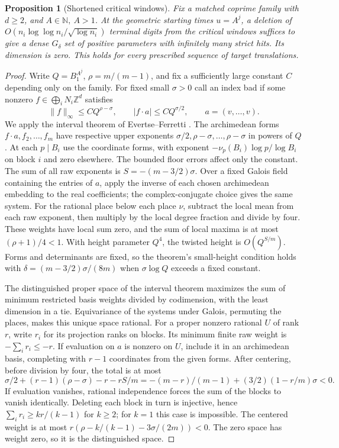 \documentclass[11pt,reqno,a4paper]{amsart}
\newtheorem{proposition}[theorem]{Proposition}
\theoremstyle{remark}
\numberwithin{equation}{section}
\begin{document}
\begin{proposition}[Shortened critical windows]\label{prop:short}
Fix a matched coprime family with \(d\ge2\), and \(A\in\mathbb N,\ A>1\). At the geometric starting times \(u=A^j\), a deletion of \(O(n_i\log\log n_i/\sqrt{\log n_i})\) terminal digits from the critical windows suffices to give a dense \(G_\delta\) set of positive parameters with infinitely many strict hits. Its dimension is zero. This holds for every prescribed sequence of target translations.
\end{proposition}
\begin{proof}
Write \(Q=B_1^{A^j}\), \(\rho=m/(m-1)\), and fix a sufficiently large constant \(C\) depending only on the family. For fixed small \(\sigma>0\) call an index bad if some nonzero \(f\in\bigoplus_i N_i\mathbb Z^d\) satisfies
\[
 \|f\|_\infty\le C Q^{\rho-\sigma},
 \qquad |f\cdot a|\le C Q^{\sigma/2},\qquad a=(v,\ldots,v).
\]
We apply the interval theorem of Evertse--Ferretti \cite[Theorem~2.3]{EF}. The archimedean forms \(f\cdot a,f_2,\ldots,f_m\) have respective upper exponents \(\sigma/2,\rho-\sigma,\ldots,\rho-\sigma\) in powers of \(Q\). At each \(p\mid B_i\) use the coordinate forms, with exponent \(-\nu_p(B_i)\log p/\log B_i\) on block \(i\) and zero elsewhere. The bounded floor errors affect only the constant. The sum of all raw exponents is \(S=-(m-3/2)\sigma\).
Over a fixed Galois field containing the entries of \(a\), apply the inverse of each chosen archimedean embedding to the real coefficients; the complex-conjugate choice gives the same system. For the rational place below each place \(\nu\), subtract the local mean from each raw exponent, then multiply by the local degree fraction and divide by four. These weights have local sum zero, and the sum of local maxima is at most \((\rho+1)/4<1\). With height parameter \(Q^4\), the twisted height is \(O(Q^{S/m})\). Forms and determinants are fixed, so the theorem's small-height condition holds with \(\delta=(m-3/2)\sigma/(8m)\) when \(\sigma\log Q\) exceeds a fixed constant.

The distinguished proper space of the interval theorem maximizes the sum of minimum restricted basis weights divided by codimension, with the least dimension in a tie. Equivariance of the systems under Galois, permuting the places, makes this unique space rational. For a proper nonzero rational \(U\) of rank \(r\), write \(r_i\) for its projection ranks on blocks. Its minimum finite raw weight is \(-\sum_i r_i\le-r\). If evaluation on \(a\) is nonzero on \(U\), include it in an archimedean basis, completing with \(r-1\) coordinates from the given forms. After centering, before division by four, the total is at most
\[
  \sigma/2+(r-1)(\rho-\sigma)-r-rS/m
    =-(m-r)/(m-1)+(3/2)(1-r/m)\sigma<0.
\]
If evaluation vanishes, rational independence forces the sum of the blocks to vanish identically. Deleting each block in turn is injective, hence \(\sum_i r_i\ge kr/(k-1)\) for \(k\ge2\); for \(k=1\) this case is impossible. The centered weight is at most \(r(\rho-k/(k-1)-3\sigma/(2m))<0\). The zero space has weight zero, so it is the distinguished space.


\end{proof}
\end{document}
